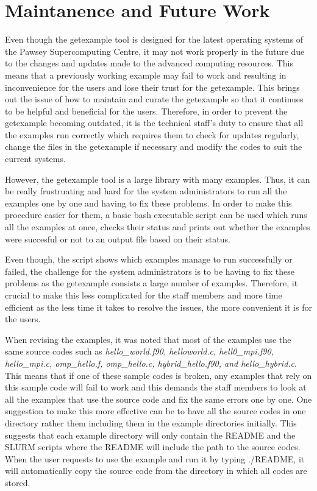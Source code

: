 \section{Maintanence and Future Work}

Even though the getexample tool is designed for the latest operating systems of the Pawsey Supercomputing Centre, it may not work properly in the future
due to the changes and updates made to the advanced computing resources. This means that a previously working example may fail to work and resulting in 
inconvenience for the users and lose their trust for the getexample. This brings out the issue of how to maintain and curate the getexample so that it 
continues to be helpful and beneficial for the users. Therefore, in order to prevent the getexample becoming outdated, it is the technical staff's duty 
to ensure that all the examples run correctly which requires them to check for updates regularly, change the files in the getexample if necessary and 
modify the codes to suit the current systems.

However, the getexample tool is a large library with many examples. Thus, it can be really frustruating and hard for the system administrators to run 
all the examples one by one and having to fix these problems. In order to make this procedure easier for them, a basic bash executable script can be 
used which runs all the examples at once, checks their status and prints out whether the examples were succesful or not to an output file based on their
status.

Even though, the script shows which examples manage to run successfully or failed, the challenge for the system administrators is to be having to fix 
these problems as the getexample consists a large number of examples. Therefore, it crucial to make this less complicated for the staff members and more
time efficient as the less time it takes to resolve the issues, the more convenient it is for the users. 

When revising the examples, it was noted that most of the examples use the same source codes such as \emph{hello\_world.f90, helloworld.c, 
hell0\_mpi.f90, hello\_mpi.c, omp\_hello.f, omp\_hello.c, hybrid\_hello.f90, and hello\_hybrid.c}. This means that if one of these sample codes is
broken, any examples that rely on this sample code will fail to work and this demands the staff members to look at all the examples that use the source
code and fix the same errors one by one. One suggestion to make this more effective can be to have all the source codes in one directory rather them
including them in the example directories initially. This suggests that each example directory will only contain the README and the SLURM scripts where
the README will include the path to the source codes. When the user requests to use the example and run it by typing ./README, it will automatically
copy the source code from the directory in which all codes are stored.

